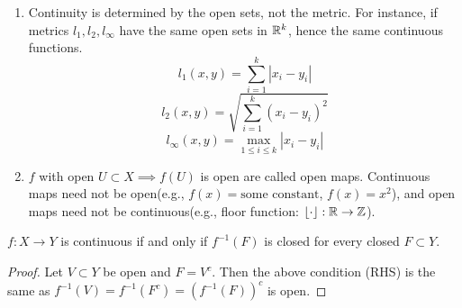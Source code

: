 \begin{theorem}
\begin{remark}
\begin{enumerate}
			\item Continuity is determined by the open sets, not the metric. For instance, if metrics $l_1,l_2,l_{\infty}$ have the same open sets in $\mathbb{R}^{k}$, hence the same continuous functions.
			      \[
				      l_1(x,y)=\sum_{i=1}^{k}{|x_i-y_i|}
			      \]
			      \[
				      l_2(x,y)=\sqrt{\sum_{i=1}^{k}{(x_i-y_i)^2}}
			      \]
			      \[
				      l_{\infty}(x,y)=\max_{1\le i\le k}{|x_i-y_i|}
			      \]
			\item $f$ with open $U \subset X \implies f(U)$ is open are called open maps. Continuous maps need not be open(e.g., $f(x)=\text{some constant}$, $f(x)=x^2$), and open maps need not be continuous(e.g., floor function: $\left\lfloor \cdot \right\rfloor: \mathbb{R}\to \mathbb{Z}$).
		\end{enumerate}
	\end{remark}
\end{theorem}

\begin{corollary}
	$f:X\to Y$ is continuous if and only if $f^{-1}(F)$ is closed for every closed $F \subset Y$.
	\begin{proof}
		Let $V \subset Y$ be open and $F=V^{c}$. Then the above condition (RHS) is the same as $f^{-1}(V)=f^{-1}(F^{c})=(f^{-1}(F))^{c}$ is open.
	\end{proof}
\end{corollary}
